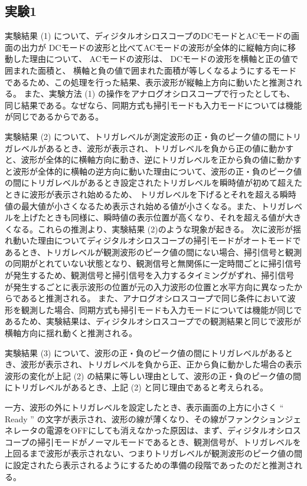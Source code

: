 \subsection{実験1}
実験結果 (1) について、ディジタルオシロスコープのDCモードとACモードの画面の出力が
DCモードの波形と比べてACモードの波形が全体的に縦軸方向に移動した理由について、
ACモードの波形は、 DCモードの波形を横軸と正の値で囲まれた面積と、
横軸と負の値で囲まれた面積が等しくなるようにするモードであるため、この処理を行った結果、表示波形が縦軸上方向に動いたと推測される。
また、実験方法 (1) の操作をアナログオシロスコープで行ったとしても、同じ結果である。なぜなら、同期方式も掃引モードも入力モードについては機能が同じであるからである。
\par
実験結果 (2) について、トリガレベルが測定波形の正・負のピーク値の間にトリガレベルがあるとき、波形が表示され、トリガレベルを負から正の値に動かすと、波形が全体的に横軸方向に動き、逆にトリガレベルを正から負の値に動かすと波形が全体的に横軸の逆方向に動いた理由について、波形の正・負のピーク値の間にトリガレベルがあるとき設定されたトリガレベルを瞬時値が初めて超えたときに波形が表示され始めるため、
トリガレベルを下げるとそれを超える瞬時値の最大値が小さくなるため表示され始める値が小さくなる。また、トリガレベルを上げたときも同様に、瞬時値の表示位置が高くなり、それを超える値が大きくなる。これらの推測より、実験結果 (2)のような現象が起きる。
次に波形が揺れ動いた理由についてディジタルオシロスコープの掃引モードがオートモードであるとき、トリガレベルが観測波形のピーク値の間にない場合、掃引信号と観測の同期がとれていない状態となり、観測信号と無関係に一定時間ごとに掃引信号が発生するため、観測信号と掃引信号を入力するタイミングがずれ、掃引信号が発生するごとに表示波形の位置が元の入力波形の位置と水平方向に異なったからであると推測される。
また、アナログオシロスコープで同じ条件において波形を観測した場合、同期方式も掃引モードも入力モードについては機能が同じであるため、実験結果は、ディジタルオシロスコープでの観測結果と同じで波形が横軸方向に揺れ動くと推測される。
\par
実験結果 (3) について、波形の正・負のピーク値の間にトリガレベルがあるとき、波形が表示され、トリガレベルを負から正、正から負に動かした場合の表示波形の変化が上記 (2) の結果に等しい理由として、波形の正・負のピーク値の間にトリガレベルがあるとき、上記 (2) と同じ理由であると考えられる。
\par
一方、波形の外にトリガレベルを設定したとき、表示画面の上方に小さく “ Ready ” の文字が表示され、波形の線が薄くなり、その線がファンクションジェネレータの電源をOFFにしても消えなかった原因は、まず、ディジタルオシロスコープの掃引モードがノーマルモードであるとき、観測信号が、トリガレベルを上回るまで波形が表示されない、つまりトリガレベルが観測波形のピーク値の間に設定されたら表示されるようにするための準備の段階であったのだと推測される。
